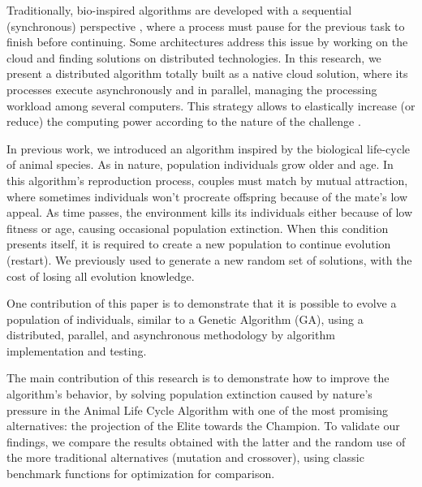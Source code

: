 \documentclass[graybox]{svmult}
\begin{document}
    Traditionally, bio-inspired algorithms are developed with a sequential
    (synchronous) perspective
    \cite{porto2018evolutionary,back1996evolutionary}, where a process must
    pause for the previous task to finish before continuing. 
    Some architectures address this issue \cite{valdez2021container,garcia2015evospace,merelo2016nodio} 
    by working on the cloud and finding solutions on distributed technologies.
    In this research, we present a distributed algorithm totally built as a 
    native cloud solution, where its processes execute asynchronously and in 
    parallel, managing the processing workload among several computers.  
    This strategy allows to elastically increase (or reduce) the
    computing power according to the nature of the challenge
    \cite{armbrust2010view}.

    In previous work, we introduced an algorithm inspired by the biological %
    life-cycle of animal species. As in nature, population individuals grow older %
    and age. In this algorithm's reproduction process, couples must match by mutual
    attraction, where sometimes individuals won't procreate offspring because of
    the mate's low appeal. As time passes, the environment kills its individuals
    either because of low fitness or age, causing occasional population extinction.
    When this condition presents itself, it is required to create a new population
    to continue evolution (restart). 
    We previously used to generate a new random %
    set of solutions, with the cost of losing all evolution knowledge.

    One contribution of this paper is to demonstrate that it is possible to
    evolve a population of individuals, similar to a Genetic Algorithm (GA),
    using a distributed, parallel, and asynchronous methodology by algorithm
    implementation and testing.

    The main contribution of this research is to demonstrate how to improve the
    algorithm's behavior, by solving population extinction caused by nature's
    pressure in the Animal Life Cycle Algorithm with one of the most promising
    alternatives: the projection of the Elite towards the Champion. To validate
    our findings, we compare the results obtained with the latter and the
    random use of the more traditional alternatives (mutation and crossover),
    using classic benchmark functions for optimization for comparison.
\end{document}
